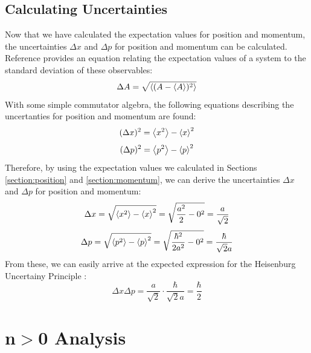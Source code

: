 \documentclass[a4paper]{article}
\begin{document}
\subsection{Calculating Uncertainties}
Now that we have calculated the expectation values for position and momentum, the uncertainties $\Delta x$ and $\Delta p$ for position and momentum can be calculated. Reference \cite[\S3.3$\sim$p.123]{RefWorks:doc:60607e6a8f08266f5a4c458e} provides an equation relating the expectation values of a system to the standard deviation of these observables:
\begin{equation}
\Delta A=\sqrt{\expval{(A-\expval A)^2}}
\end{equation}
With some simple commutator algebra, the following equations describing the uncertanties for position and momentum are found:
\begin{equation}\label{eq:Dx}
(\Delta x)^2=\expval{x^2}-\expval x^2
\end{equation}
\begin{equation}\label{eq:Dp}
  (\Delta p)^2=\expval{p^2}-\expval p^2
\end{equation}
Therefore, by using the expectation values we calculated in Sections \ref{section:position} and \ref{section:momentum}, we can derive the uncertainties $\Delta x$ and $\Delta p$ for position and momentum:
\begin{equation}
\Delta x = \sqrt{\expval{x^2}-\expval x^2} = \sqrt{ \frac{a^2}2 -0^2}=\frac a{\sqrt 2}
\end{equation}
\begin{equation}
\Delta p = \sqrt{\expval{p^2}-\expval p^2} = \sqrt{ \frac{\hbar^2}{2a^2} -0^2}=\frac\hbar{\sqrt 2 a}
\end{equation}
From these, we can easily arrive at the expected expression for the Heisenburg Uncertainy Principle \cite[Eq.63$\sim$p.113]{RefWorks:doc:606076f48f081b19e4859e9a}:
\begin{equation} \label{eq:dxdp}
\Delta x\Delta p=\frac a{\sqrt2}\cdot\frac\hbar{\sqrt2a}=\frac\hbar2
\end{equation}

\section{n$>$0 Analysis}
\end{document}
